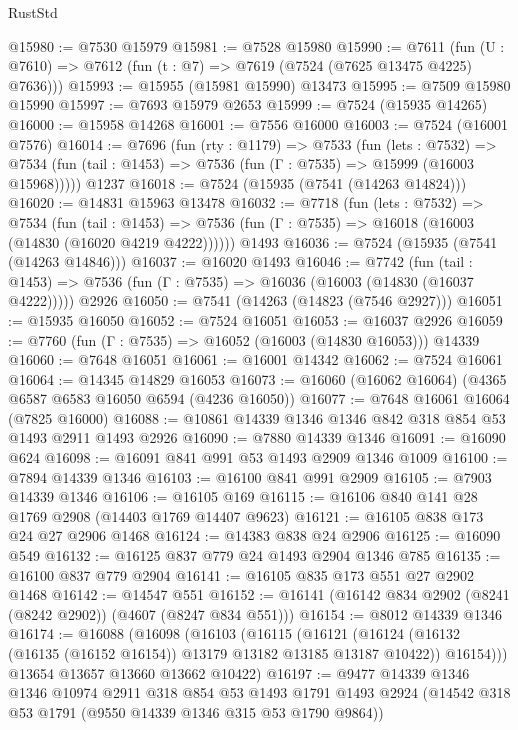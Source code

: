 \begin{lexlean}{RustStd}
\begin{coremodule}
@15980 := @7530 @15979
@15981 := @7528 @15980
@15990 := @7611
    (fun (U : @7610) => @7612 (fun (t : @7) => @7619 (@7524 (@7625 @13475 @4225) @7636)))
@15993 := @15955 (@15981 @15990) @13473
@15995 := @7509 @15980 @15990
@15997 := @7693 @15979 @2653
@15999 := @7524 (@15935 @14265)
@16000 := @15958 @14268
@16001 := @7556 @16000
@16003 := @7524 (@16001 @7576)
@16014 := @7696
    (fun (rty : @1179) =>
    @7533
      (fun (lets : @7532) =>
      @7534 (fun (tail : @1453) => @7536 (fun (Γ : @7535) => @15999 (@16003 @15968)))))
    @1237
@16018 := @7524 (@15935 (@7541 (@14263 @14824)))
@16020 := @14831 @15963 @13478
@16032 := @7718
    (fun (lets : @7532) =>
    @7534
      (fun (tail : @1453) =>
      @7536 (fun (Γ : @7535) => @16018 (@16003 (@14830 (@16020 @4219 @4222))))))
    @1493
@16036 := @7524 (@15935 (@7541 (@14263 @14846)))
@16037 := @16020 @1493
@16046 := @7742
    (fun (tail : @1453) => @7536 (fun (Γ : @7535) => @16036 (@16003 (@14830 (@16037 @4222)))))
    @2926
@16050 := @7541 (@14263 (@14823 (@7546 @2927)))
@16051 := @15935 @16050
@16052 := @7524 @16051
@16053 := @16037 @2926
@16059 := @7760 (fun (Γ : @7535) => @16052 (@16003 (@14830 @16053))) @14339
@16060 := @7648 @16051
@16061 := @16001 @14342
@16062 := @7524 @16061
@16064 := @14345 @14829 @16053
@16073 := @16060 (@16062 @16064) (@4365 @6587 @6583 @16050 @6594 (@4236 @16050))
@16077 := @7648 @16061 @16064 (@7825 @16000)
@16088 := @10861 @14339 @1346 @1346 @842 @318 @854 @53 @1493 @2911 @1493 @2926
@16090 := @7880 @14339 @1346
@16091 := @16090 @624
@16098 := @16091 @841 @991 @53 @1493 @2909 @1346 @1009
@16100 := @7894 @14339 @1346
@16103 := @16100 @841 @991 @2909
@16105 := @7903 @14339 @1346
@16106 := @16105 @169
@16115 := @16106 @840 @141 @28 @1769 @2908 (@14403 @1769 @14407 @9623)
@16121 := @16105 @838 @173 @24 @27 @2906 @1468
@16124 := @14383 @838 @24 @2906
@16125 := @16090 @549
@16132 := @16125 @837 @779 @24 @1493 @2904 @1346 @785
@16135 := @16100 @837 @779 @2904
@16141 := @16105 @835 @173 @551 @27 @2902 @1468
@16142 := @14547 @551
@16152 := @16141 (@16142 @834 @2902 (@8241 (@8242 @2902)) (@4607 (@8247 @834 @551)))
@16154 := @8012 @14339 @1346
@16174 := @16088
    (@16098
      (@16103
        (@16115
          (@16121
            (@16124 (@16132 (@16135 (@16152 @16154)) @13179 @13182 @13185 @13187 @10422))
            @16154)))
      @13654
      @13657
      @13660
      @13662
      @10422)
@16197 := @9477
    @14339
    @1346
    @1346
    @10974
    @2911
    @318
    @854
    @53
    @1493
    @1791
    @1493
    @2924
    (@14542 @318 @53 @1791 (@9550 @14339 @1346 @315 @53 @1790 @9864))

\end{coremodule}
\end{lexlean}
